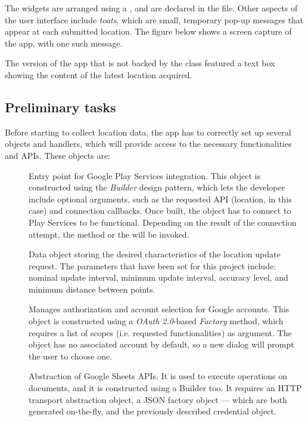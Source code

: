 The widgets are arranged using a , and are declared in the  file.
Other aspects of the user interface include \emph{toats}, which are small, temporary pop-up messages that appear at each submitted location.
The figure below shows a screen capture of the app, with one such message.


The version of the app that is not backed by the  class featured a text box showing the content of the latest location acquired.


\subsection{Preliminary tasks}
Before starting to collect location data, the app has to correctly set up several objects and handlers, which will provide access to the necessary functionalities and APIs.
These objects are:
\begin{description}
	\item[] Entry point for Google Play Services integration. This object is constructed using the \emph{Builder} design pattern, which lets the developer include optional arguments, such as the requested API (location, in this case) and connection callbacks. Once built, the object has to connect to Play Services to be functional. Depending on the result of the connection attempt, the  method or the  will be invoked.
	\item[] Data object storing the desired characteristics of the location update request. The parameters that have been set for this project include: nominal update interval, minimum update interval, accuracy level, and minimum distance between points.
	\item[] Manages authorization and account selection for Google accounts. This object is constructed using a \emph{OAuth 2.0}-based \emph{Factory} method, which requires a list of scopes (i.e. requested functionalities) as argument. The object has no associated account by default, so a new dialog will prompt the user to choose one.
	\item[] Abstraction of Google Sheets APIs. It is used to execute operations on documents, and it is constructed using a Builder too. It requires an HTTP transport abstraction object, a JSON factory object --- which are both generated on-the-fly, and the previously described credential object.
\end{description}


